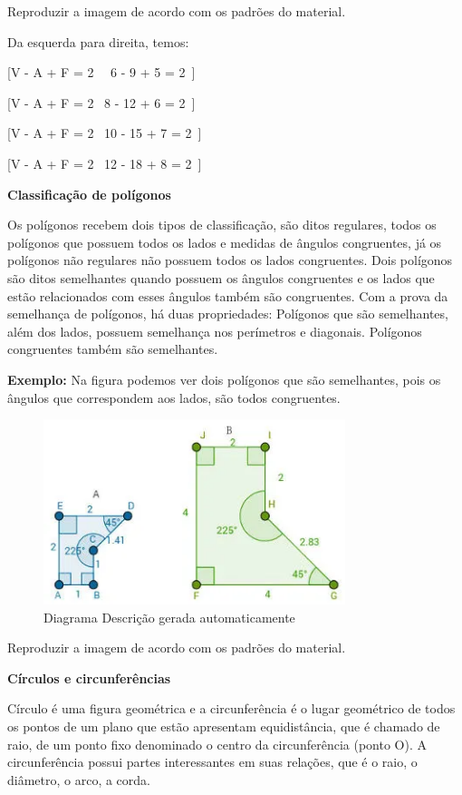 Reproduzir a imagem de acordo com os padrões do material.

Da esquerda para direita, temos:

[V - A + F = 2 \rightarrow \ \ 6 - 9 + 5 = 2\ ]

[V - A + F = 2 \rightarrow \ 8 - 12 + 6 = 2\ ]

[V - A + F = 2 \rightarrow \ 10 - 15 + 7 = 2\ ]

[V - A + F = 2 \rightarrow \ 12 - 18 + 8 = 2\ ]

\textbf{Classificação de polígonos}

Os polígonos recebem dois tipos de classificação, são ditos regulares,
todos os polígonos que possuem todos os lados e medidas de ângulos
congruentes, já os polígonos não regulares não possuem todos os lados
congruentes. Dois polígonos são ditos semelhantes quando possuem os
ângulos congruentes e os lados que estão relacionados com esses ângulos
também são congruentes. Com a prova da semelhança de polígonos, há duas
propriedades: Polígonos que são semelhantes, além dos lados, possuem
semelhança nos perímetros e diagonais. Polígonos congruentes também são
semelhantes.~

\textbf{Exemplo:} Na figura podemos ver dois polígonos que são
semelhantes, pois os ângulos que correspondem aos lados, são todos
congruentes.

\begin{figure}
\centering
\includegraphics[width=3.46875in,height=2.125in]{./imgSAEB_7_MAT/media/image27.png}
\caption{Diagrama Descrição gerada automaticamente}
\end{figure}

Reproduzir a imagem de acordo com os padrões do material.

\textbf{Círculos e circunferências}

Círculo é uma figura geométrica e a circunferência é o lugar geométrico
de todos os pontos de um plano que estão apresentam equidistância, que é
chamado de~ raio, de um ponto fixo denominado o centro da circunferência
(ponto O). A circunferência possui partes interessantes em suas
relações, que é o raio, o diâmetro, o arco, a corda.

